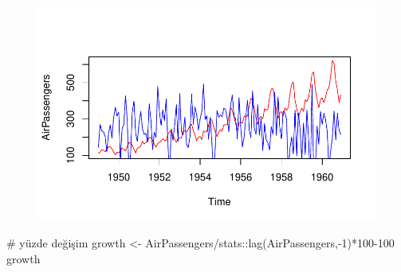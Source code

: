 \documentclass[
  letterpaper,
  DIV=11,
  numbers=noendperiod]{scrreprt}
\newenvironment{Shaded}{\begin{snugshade}}{\end{snugshade}}
\newcommand{\CommentTok}[1]{\textcolor[rgb]{0.37,0.37,0.37}{#1}}
\newcommand{\DecValTok}[1]{\textcolor[rgb]{0.68,0.00,0.00}{#1}}
\newcommand{\FunctionTok}[1]{\textcolor[rgb]{0.28,0.35,0.67}{#1}}
\newcommand{\NormalTok}[1]{\textcolor[rgb]{0.00,0.23,0.31}{#1}}
\newcommand{\OtherTok}[1]{\textcolor[rgb]{0.00,0.23,0.31}{#1}}
\newcommand{\SpecialCharTok}[1]{\textcolor[rgb]{0.37,0.37,0.37}{#1}}
\begin{document}
\begin{figure}[H]

{\centering \includegraphics{data_analysis_files/figure-pdf/unnamed-chunk-5-7.pdf}

}

\end{figure}

\begin{Shaded}
\begin{Highlighting}[]
\CommentTok{\# yüzde değişim}
\NormalTok{growth }\OtherTok{\textless{}{-}}\NormalTok{ AirPassengers}\SpecialCharTok{/}\NormalTok{stats}\SpecialCharTok{::}\FunctionTok{lag}\NormalTok{(AirPassengers,}\SpecialCharTok{{-}}\DecValTok{1}\NormalTok{)}\SpecialCharTok{*}\DecValTok{100{-}100}
\NormalTok{growth}
\end{Highlighting}
\end{Shaded}
\end{document}
